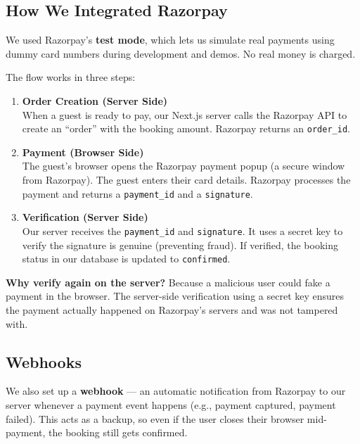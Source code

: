 \documentclass[12pt,a4paper]{article}
\begin{document}
\subsection{How We Integrated Razorpay}

We used Razorpay's \textbf{test mode}, which lets us simulate real payments using dummy card numbers during development and demos. No real money is charged.

The flow works in three steps:

\begin{enumerate}
  \item \textbf{Order Creation (Server Side)} \\
  When a guest is ready to pay, our Next.js server calls the Razorpay API to create an ``order'' with the booking amount. Razorpay returns an \texttt{order\_id}.

  \item \textbf{Payment (Browser Side)} \\
  The guest's browser opens the Razorpay payment popup (a secure window from Razorpay). The guest enters their card details. Razorpay processes the payment and returns a \texttt{payment\_id} and a \texttt{signature}.

  \item \textbf{Verification (Server Side)} \\
  Our server receives the \texttt{payment\_id} and \texttt{signature}. It uses a secret key to verify the signature is genuine (preventing fraud). If verified, the booking status in our database is updated to \texttt{confirmed}.
\end{enumerate}

\begin{notebox}
\textbf{Why verify again on the server?} Because a malicious user could fake a payment in the browser. The server-side verification using a secret key ensures the payment actually happened on Razorpay's servers and was not tampered with.
\end{notebox}

\subsection{Webhooks}
We also set up a \textbf{webhook} --- an automatic notification from Razorpay to our server whenever a payment event happens (e.g., payment captured, payment failed). This acts as a backup, so even if the user closes their browser mid-payment, the booking still gets confirmed.
\end{document}
